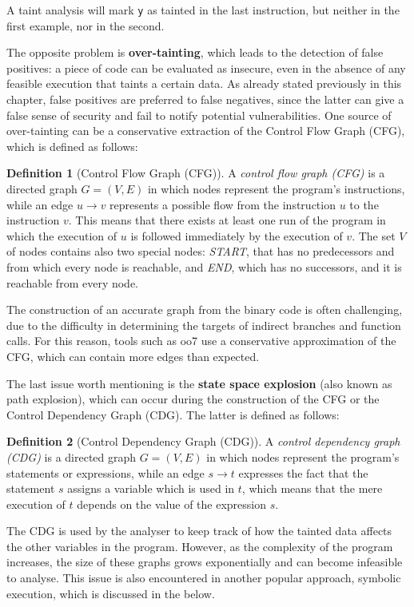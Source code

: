 \documentclass[target=mst,aauheader=aics]{thud}
\theoremstyle{definition}
\newtheorem{defn}{Definition}
\begin{document}
	A taint analysis will mark \texttt{y} as tainted in the last instruction, but neither in the first example, nor in the second.
	
	The opposite problem is \textbf{over-tainting}, which leads to the detection of false positives: a piece of code can be evaluated as insecure, even in the absence of any feasible execution that taints a certain data. As already stated previously in this chapter, false positives are preferred to false negatives, since the latter can give a false sense of security and fail to notify potential vulnerabilities. One source of over-tainting can be a conservative extraction of the Control Flow Graph (CFG), which is defined as follows:
	\begin{defn}[Control Flow Graph (CFG)]
		A \textit{control flow graph (CFG)} is a directed graph $G=(V,E)$ in which nodes represent the program's instructions, while an edge $u \rightarrow v$ represents a possible flow from the instruction $u$ to the instruction $v$. This means that there exists at least one run of the program in which the execution of $u$ is followed immediately by the execution of $v$. The set $V$ of nodes contains also two special nodes: \textit{START}, that has no predecessors and from which every node is reachable, and \textit{END}, which has no successors, and it is reachable from every node.
	\end{defn}
	
	The construction of an accurate graph from the binary code is often challenging, due to the difficulty in determining the targets of indirect branches and function calls. For this reason, tools such as oo7 \cite{Wang2019} use a conservative approximation of the CFG, which can contain more edges than expected.
	
	The last issue worth mentioning is the \textbf{state space explosion} (also known as path explosion), which can occur during the construction of the CFG or the Control Dependency Graph (CDG). The latter is defined as follows:
	
	\begin{defn}[Control Dependency Graph (CDG)]
		A \textit{control dependency graph (CDG)} \cite{Krinke2007} is a directed graph $G=(V,E)$ in which nodes represent the program's statements or expressions, while an edge $s\rightarrow t$ expresses the fact that the statement $s$ assigns a variable which is used in $t$, which means that the mere execution of $t$ depends on the value of the expression $s$. 
	\end{defn}
	The CDG is used by the analyser to keep track of how the tainted data affects the other variables in the program. However, as the complexity of the program increases, the size of these graphs grows exponentially and can become infeasible to analyse. This issue is also encountered in another popular approach, symbolic execution, which is discussed in the below. 
\end{document}
